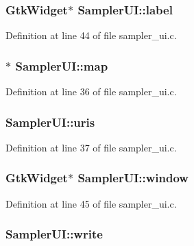 \subsubsection[{\texorpdfstring{label}{label}}]{\setlength{\rightskip}{0pt plus 5cm}Gtk\+Widget$\ast$ Sampler\+U\+I\+::label}\hypertarget{struct_sampler_u_i_a25af054ff8222653e4527f88007861b1}{}\label{struct_sampler_u_i_a25af054ff8222653e4527f88007861b1}


Definition at line 44 of file sampler\+\_\+ui.\+c.

\subsubsection[{\texorpdfstring{map}{map}}]{$\ast$ Sampler\+U\+I\+::map}\hypertarget{struct_sampler_u_i_ab70cd8f6772ae2a6127b66d1b0aeb7e4}{}\label{struct_sampler_u_i_ab70cd8f6772ae2a6127b66d1b0aeb7e4}


Definition at line 36 of file sampler\+\_\+ui.\+c.

\subsubsection[{\texorpdfstring{uris}{uris}}]{ Sampler\+U\+I\+::uris}\hypertarget{struct_sampler_u_i_a6b8842578d50959dfeebae4fabd1f411}{}\label{struct_sampler_u_i_a6b8842578d50959dfeebae4fabd1f411}


Definition at line 37 of file sampler\+\_\+ui.\+c.

\subsubsection[{\texorpdfstring{window}{window}}]{\setlength{\rightskip}{0pt plus 5cm}Gtk\+Widget$\ast$ Sampler\+U\+I\+::window}\hypertarget{struct_sampler_u_i_aaa0ff0f59c4d8c45afe44c1936a3378e}{}\label{struct_sampler_u_i_aaa0ff0f59c4d8c45afe44c1936a3378e}


Definition at line 45 of file sampler\+\_\+ui.\+c.

\subsubsection[{\texorpdfstring{write}{write}}]{ Sampler\+U\+I\+::write}\hypertarget{struct_sampler_u_i_af1e10fbeff622855a17bc40e09c99674}{}\label{struct_sampler_u_i_af1e10fbeff622855a17bc40e09c99674}


